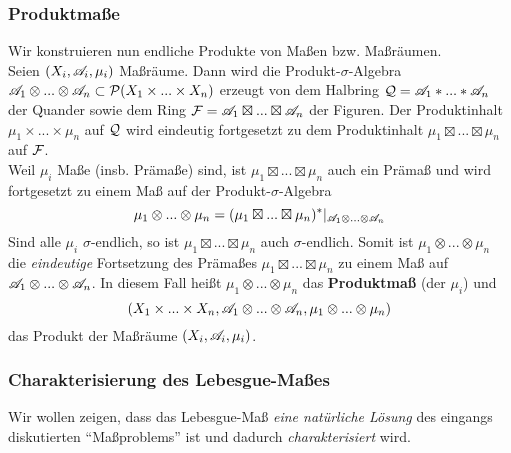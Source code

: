 \subsubsection{Produktmaße}
Wir konstruieren nun endliche Produkte von Maßen bzw. Maßräumen.
\vspace{0.5pc}
\\Seien $(X_i,\AA_i,\mu_i)$ Maßräume. Dann wird die Produkt-$\sigma$-Algebra $\AA_1 \otimes ... \otimes \AA_n \subset \PP(X_1\times ... \times X_n)$ erzeugt von dem Halbring $\QQ =\AA_1 \ast ... \ast \AA_n$ der Quander sowie dem Ring $\FF=\AA_1 \boxtimes ... \boxtimes \AA_n$ der Figuren. Der Produktinhalt $\mu_1 \times ... \times \mu_n$ auf $\QQ$ wird eindeutig fortgesetzt zu dem Produktinhalt $\mu_1 \boxtimes ... \boxtimes \mu_n$ auf $\FF$.
\vspace{0.5pc}
\\ Weil $\mu_i$ Maße (insb. Prämaße) sind, ist $\mu_1 \boxtimes ... \boxtimes \mu_n$ auch ein Prämaß und wird fortgesetzt zu einem Maß auf der Produkt-$\sigma$-Algebra
$$
\mu_1 \otimes ... \otimes \mu_n =  (\mu_1 \boxtimes ... \boxtimes \mu_n)^*|_{\AA_1 \otimes ... \otimes \AA_n}
$$
Sind alle $\mu_i$ $\sigma$-endlich, so ist $\mu_1 \boxtimes ... \boxtimes \mu_n$ auch $\sigma$-endlich. Somit ist $\mu_1 \otimes ... \otimes \mu_n $ die \emph{eindeutige} Fortsetzung des Prämaßes $\mu_1 \boxtimes ... \boxtimes \mu_n$ zu einem Maß auf $\AA_1 \otimes ... \otimes \AA_n$. In diesem Fall heißt $\mu_1 \otimes ... \otimes \mu_n$ das \textbf{Produktmaß} (der $\mu_i$) und 
$$
(X_1 \times ... \times X_n, \AA_1 \otimes ... \otimes \AA_n, \mu_1 \otimes ... \otimes \mu_n)
$$
das Produkt der Maßräume $(X_i,\AA_i,\mu_i)$.


\subsubsection{Charakterisierung des Lebesgue-Maßes}
Wir wollen zeigen, dass das Lebesgue-Maß \emph{eine natürliche Lösung} des eingangs diskutierten ``Maßproblems'' ist und dadurch \emph{charakterisiert} wird.

